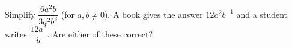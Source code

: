 Simplify $\dfrac{6a^2b}{3a^2b^3}$ (for $a,b\ne0$). A book gives the answer $12a^2b^{-1}$ and a student writes $\dfrac{12a^2}{b}$. Are either of these correct?
